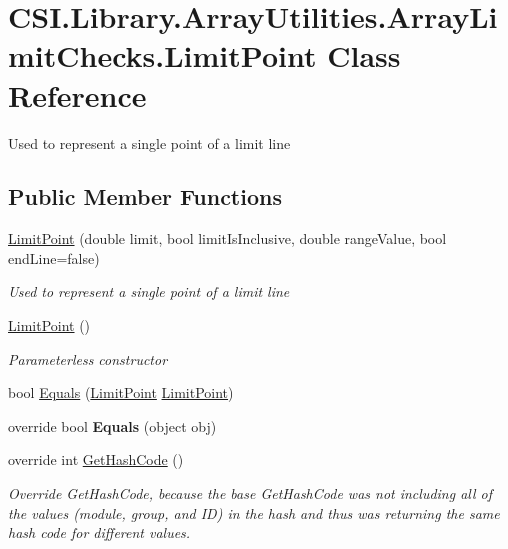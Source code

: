 \hypertarget{class_c_s_i_1_1_library_1_1_array_utilities_1_1_array_limit_checks_1_1_limit_point}{}\section{C\+S\+I.\+Library.\+Array\+Utilities.\+Array\+Limit\+Checks.\+Limit\+Point Class Reference}
\label{class_c_s_i_1_1_library_1_1_array_utilities_1_1_array_limit_checks_1_1_limit_point}


Used to represent a single point of a limit line  


\subsection*{Public Member Functions}
\begin{DoxyCompactItemize}
\item 
\mbox{\hyperlink{class_c_s_i_1_1_library_1_1_array_utilities_1_1_array_limit_checks_1_1_limit_point_a6a7bedf82a8e1015308acc9afb835512}{Limit\+Point}} (double limit, bool limit\+Is\+Inclusive, double range\+Value, bool end\+Line=false)
\begin{DoxyCompactList}\small\item\em Used to represent a single point of a limit line \end{DoxyCompactList}\item 
\mbox{\hyperlink{class_c_s_i_1_1_library_1_1_array_utilities_1_1_array_limit_checks_1_1_limit_point_a1bca78d7a3bc3ebe4a4fdcecb97f6ef9}{Limit\+Point}} ()
\begin{DoxyCompactList}\small\item\em Parameterless constructor \end{DoxyCompactList}\item 
bool \mbox{\hyperlink{class_c_s_i_1_1_library_1_1_array_utilities_1_1_array_limit_checks_1_1_limit_point_a9928348718632fa0f2a5f94d02f4171e}{Equals}} (\mbox{\hyperlink{class_c_s_i_1_1_library_1_1_array_utilities_1_1_array_limit_checks_1_1_limit_point}{Limit\+Point}} \mbox{\hyperlink{class_c_s_i_1_1_library_1_1_array_utilities_1_1_array_limit_checks_1_1_limit_point}{Limit\+Point}})
\item 
\mbox{\label{class_c_s_i_1_1_library_1_1_array_utilities_1_1_array_limit_checks_1_1_limit_point_aefcfb1f9c945b02c6f9e1186e7f42546}} 
override bool {\bfseries Equals} (object obj)
\item 
override int \mbox{\hyperlink{class_c_s_i_1_1_library_1_1_array_utilities_1_1_array_limit_checks_1_1_limit_point_a5ad861288e1ad6b8c772dd022e8fb48b}{Get\+Hash\+Code}} ()
\begin{DoxyCompactList}\small\item\em Override Get\+Hash\+Code, because the base Get\+Hash\+Code was not including all of the values (module, group, and ID) in the hash and thus was returning the same hash code for different values. \end{DoxyCompactList}\end{DoxyCompactItemize}
